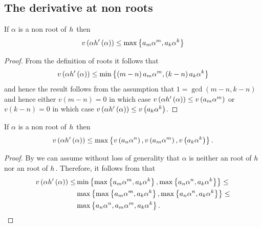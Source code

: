 \documentclass[../main.tex]{subfiles}
\begin{document}
  \subsection{The derivative at non \ex roots}
  \begin{lemma}
    \label{lem:non_es_bound}
    If $\alpha$ is a non  root of $h_{}$ then
    \[
      v\left( \alpha h_{}'\left( \alpha \right) \right) 
      \leq
      \max\left\{ a_m \alpha^m, a_k \alpha^k \right\} 
    \]
  \end{lemma}
  \begin{proof}
    From the definition of  roots it follows that 
    \[
      v\left( \alpha h_{}'\left( \alpha \right) \right) 
      \leq
      \min\left\{ \left( m - n \right)a_m \alpha^m, \left( k - n \right)a_k \alpha^k \right\}
    \]
    and hence the result follows from the assumption that 
    $
      1 = \gcd\left( m - n, k - n \right)
    $
    and hence either $v\left( m-n \right) = 0$ in which case $v\left( \alpha h_{}'\left( \alpha \right) \right) \leq v\left( a_m \alpha^m \right)$ or $v\left( k - n \right) = 0$ in which case $v\left( \alpha h_{}'\left( \alpha \right) \right) \leq v\left( a_k \alpha^k \right)$.
  \end{proof}

  \begin{corollary}
    \label{cor:non_ex_bound}
    If $\alpha$ is a non \ex root of $h_{}$ then
    \[
      v\left( \alpha h_{}'\left( \alpha \right) \right) 
      \leq
      \max\left\{  
        v\left( a_n \alpha^n \right),
        v\left( a_m \alpha^m \right),
        v\left( a_k \alpha^k \right)
      \right\}.
    \]
  \end{corollary}
  \begin{proof}
    By  we can assume without loss of generality that $\alpha$ is neither an  root of $h_{}$ nor an  root of $h_{}$.
    Therefore, it follows from  that 
    \begin{align*}
      v\left( \alpha h_{}'\left( \alpha \right) \right)
      \leq
      &
      \min\left\{  
        \max\left\{  
          a_m \alpha^m,
          a_k \alpha^k
        \right\},  
        \max\left\{  
          a_n \alpha^n,
          a_k \alpha^k
        \right\}
      \right\}
      \leq \\
      & \max\left\{  
        \max\left\{  
          a_m \alpha^m,
          a_k \alpha^k
        \right\},  
        \max\left\{  
          a_n \alpha^n,
          a_k \alpha^k
        \right\}
      \right\} \leq \\
      & \max\left\{  
        a_n \alpha^n,
        a_m \alpha^m,
        a_k \alpha^k
      \right\}
      .
    \end{align*} 
  \end{proof}
\end{document}
